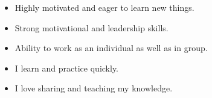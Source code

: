 

\begin{cvparagraph}

\begin{itemize}
    \item[] Highly motivated and eager to learn new things.
    \item[] Strong motivational and leadership skills.
    \item[] Ability to work as an individual as well as in group.
    \item[] I learn and practice quickly.
    \item[] I love sharing and teaching my knowledge.
\end{itemize}
\end{cvparagraph}